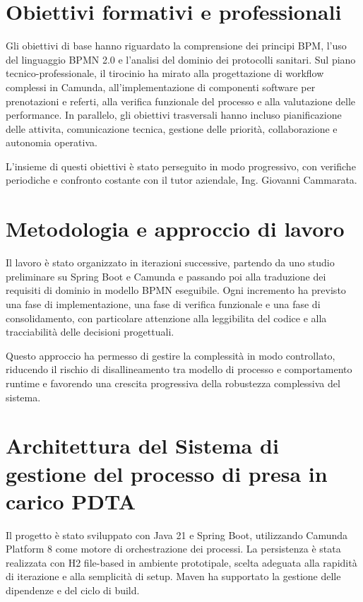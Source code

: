 \documentclass[12pt,a4paper]{article}
\begin{document}
\section{Obiettivi formativi e professionali}

Gli obiettivi di base hanno riguardato la comprensione dei principi BPM, l'uso del linguaggio BPMN 2.0 e l'analisi del dominio dei protocolli sanitari. Sul piano tecnico-professionale, il tirocinio ha mirato alla progettazione di workflow complessi in Camunda, all'implementazione di componenti software per prenotazioni e referti, alla verifica funzionale del processo e alla valutazione delle performance. In parallelo, gli obiettivi trasversali hanno incluso pianificazione delle attivita, comunicazione tecnica, gestione delle priorità, collaborazione e autonomia operativa.

L'insieme di questi obiettivi è stato perseguito in modo progressivo, con verifiche periodiche e confronto costante con il tutor aziendale, Ing. Giovanni Cammarata.

\section{Metodologia e approccio di lavoro}

Il lavoro è stato organizzato in iterazioni successive, partendo da uno studio preliminare su Spring Boot e Camunda e passando poi alla traduzione dei requisiti di dominio in modello BPMN eseguibile. Ogni incremento ha previsto una fase di implementazione, una fase di verifica funzionale e una fase di consolidamento, con particolare attenzione alla leggibilita del codice e alla tracciabilità delle decisioni progettuali.

Questo approccio ha permesso di gestire la complessità in modo controllato, riducendo il rischio di disallineamento tra modello di processo e comportamento runtime e favorendo una crescita progressiva della robustezza complessiva del sistema.

\section{Architettura del Sistema di gestione del processo di presa in carico PDTA}

Il progetto è stato sviluppato con Java 21 e Spring Boot, utilizzando Camunda Platform 8 come motore di orchestrazione dei processi. La persistenza è stata realizzata con H2 file-based in ambiente prototipale, scelta adeguata alla rapidità di iterazione e alla semplicità di setup. Maven ha supportato la gestione delle dipendenze e del ciclo di build.
\end{document}
